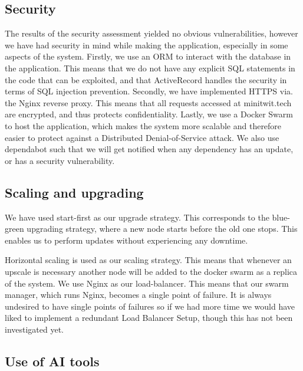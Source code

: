 \documentclass{article}
\begin{document}
\subsection{Security}
The results of the security assessment yielded no obvious vulnerabilities, however we have had security in mind while making the application, especially in some aspects of the system. Firstly, we use an ORM to interact with the database in the application. This means that we do not have any explicit SQL statements in the code that can be exploited, and that ActiveRecord handles the security in terms of SQL injection prevention. Secondly, we have implemented HTTPS via. the Nginx reverse proxy. This means that all requests accessed at minitwit.tech are encrypted, and thus protects confidentiality. Lastly, we use a Docker Swarm to host the application, which makes the system more scalable and therefore easier to protect against a Distributed Denial-of-Service attack. We also use dependabot such that we will get notified when any dependency has an update, or has a security vulnerability.

\subsection{Scaling and upgrading}
We have used start-first as our upgrade strategy. This corresponds to the blue-green upgrading strategy, where a new node starts before the old one stops. This enables us to perform updates without experiencing any downtime.


Horizontal scaling is used as our scaling strategy. This means that whenever an upscale is necessary another node will be added to the docker swarm as a replica of the system. We use Nginx as our load-balancer. This means that our swarm manager, which runs Nginx, becomes a single point of failure. It is always undesired to have single points of failures so if we had more time we would have liked to implement a redundant Load Balancer Setup, though this has not been investigated yet.


\subsection{Use of AI tools}
\end{document}
